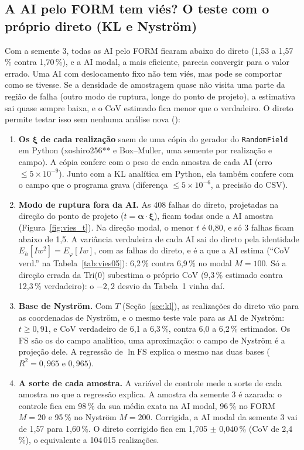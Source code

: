 \documentclass[11pt,a4paper]{article}
\begin{document}
\subsection{A AI pelo FORM tem viés? O teste com o próprio direto (KL e Nyström)}\label{sec:vies}
Com a semente 3, todas as AI pelo FORM ficaram abaixo do direto (1,53 a 1,57\,\% contra 1,70\,\%), e a AI modal, a mais
eficiente, parecia convergir para o valor errado. Uma AI com deslocamento fixo não tem viés, mas pode se comportar como se
tivesse. Se a densidade de amostragem quase não visita uma parte da região de falha (outro modo de ruptura, longe do
ponto de projeto), a estimativa sai quase sempre baixa, e o CoV estimado fica menor que o verdadeiro. O direto permite
testar isso sem nenhuma análise nova ():
\begin{enumerate}
  \item \textbf{Os $\bm\xi$ de cada realização} saem de uma cópia do gerador do \texttt{RandomField} em Python
    (xoshiro256** e Box--Muller, uma semente por realização e campo). A cópia confere com o peso de cada amostra de cada
    AI (erro $\le 5\times10^{-9}$). Junto com a KL analítica em Python, ela
    também confere com o campo que o programa grava (diferença $\le 5\times10^{-6}$, a precisão do CSV).
  \item \textbf{Modo de ruptura fora da AI.} As 408 falhas do direto, projetadas na direção
    do ponto de projeto ($t = \bm\alpha\cdot\bm\xi$), ficam todas onde a AI amostra (Figura~\ref{fig:vies_t}). Na direção
    modal, o menor $t$ é 0{,}80, e só 3 falhas ficam abaixo de
    1,5. A variância verdadeira de cada AI sai do direto pela identidade $E_h[I w^2] = E_\varphi[I w]$, com as falhas do
    direto, e é a que a AI estima (``CoV verd.'' na Tabela~\ref{tab:vies05}): 6{,}2\,\% contra 6{,}9\,\% no modal $M = 100$. Só a direção errada da Tri(0)
    subestima o próprio CoV (9{,}3\,\% estimado contra 12{,}3\,\% verdadeiro): o $-2{,}2$ desvio da Tabela~1 vinha daí.
  \item \textbf{Base de Nyström.} Com $T$ (Seção~\ref{sec:kl}), as realizações do direto vão para as coordenadas de
    Nyström, e o mesmo teste vale para as AI de Nyström: $t \ge 0{,}91$, e
    CoV verdadeiro de 6{,}1 a 6{,}3\,\%, contra 6{,}0 a 6{,}2\,\% estimados. Os FS são os do campo
    analítico, uma aproximação: o campo de Nyström é a projeção dele. A regressão de $\ln\mathrm{FS}$ explica o mesmo nas
    duas bases ($R^2 = 0{,}965$ e $0{,}965$).
  \item \textbf{A sorte de cada amostra.} A variável de controle mede a sorte de cada amostra no que a regressão explica.
    A amostra da semente 3 é azarada: o controle fica em 98\,\% da sua média exata na
    AI modal, 96\,\% no FORM $M = 20$ e 95\,\%
    no Nyström $M = 200$. Corrigida, a AI modal da semente 3 vai de 1{,}57 para 1{,}60\,\%. O direto corrigido fica em 1{,}705 $\pm$ 0{,}040\,\%
    (CoV de 2{,}4\,\%), o equivalente a 104\,015 realizações.
\end{enumerate}
\end{document}
